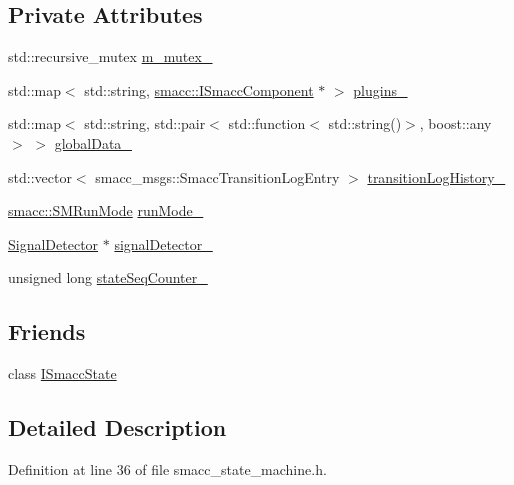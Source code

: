 \subsection*{Private Attributes}
\begin{DoxyCompactItemize}
\item 
std\+::recursive\+\_\+mutex \hyperlink{classsmacc_1_1ISmaccStateMachine_aac785541646e5c517273bf31072505a1}{m\+\_\+mutex\+\_\+}
\item 
std\+::map$<$ std\+::string, \hyperlink{classsmacc_1_1ISmaccComponent}{smacc\+::\+I\+Smacc\+Component} $\ast$ $>$ \hyperlink{classsmacc_1_1ISmaccStateMachine_a7f07e884dfad5ff7182230290cb337b8}{plugins\+\_\+}
\item 
std\+::map$<$ std\+::string, std\+::pair$<$ std\+::function$<$ std\+::string()$>$, boost\+::any $>$ $>$ \hyperlink{classsmacc_1_1ISmaccStateMachine_ad2f9dae184ea942db632ac4532a10a91}{global\+Data\+\_\+}
\item 
std\+::vector$<$ smacc\+\_\+msgs\+::\+Smacc\+Transition\+Log\+Entry $>$ \hyperlink{classsmacc_1_1ISmaccStateMachine_af682d5fce5bb7c959e2b8814dae50023}{transition\+Log\+History\+\_\+}
\item 
\hyperlink{namespacesmacc_a3e4f79486ea6ea6342dd3c712d16a4f6}{smacc\+::\+S\+M\+Run\+Mode} \hyperlink{classsmacc_1_1ISmaccStateMachine_a9f8cfbf577f7ae7a48b7a328e2e6b589}{run\+Mode\+\_\+}
\item 
\hyperlink{classsmacc_1_1SignalDetector}{Signal\+Detector} $\ast$ \hyperlink{classsmacc_1_1ISmaccStateMachine_a3982eb671f5f001cb047d3a467789986}{signal\+Detector\+\_\+}
\item 
unsigned long \hyperlink{classsmacc_1_1ISmaccStateMachine_ab41ee07d20715142e2f7c92d551b2bd6}{state\+Seq\+Counter\+\_\+}
\end{DoxyCompactItemize}
\subsection*{Friends}
\begin{DoxyCompactItemize}
\item 
class \hyperlink{classsmacc_1_1ISmaccStateMachine_ab907e4cdbf326246355f56640780162e}{I\+Smacc\+State}
\end{DoxyCompactItemize}


\subsection{Detailed Description}


Definition at line 36 of file smacc\+\_\+state\+\_\+machine.\+h.




